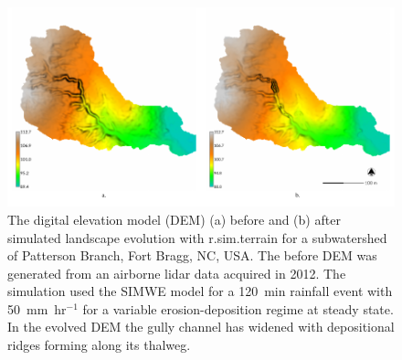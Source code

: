\documentclass[gmd, manuscript]{copernicus}
\begin{document}


\begin{figure}%
\center
\includegraphics[width=\textwidth,height=0.925\textheight,keepaspectratio]{figures/evolution.pdf}
\caption{
The digital elevation model (DEM) 
(a) before and (b) after
simulated landscape evolution with r.sim.terrain 
for a subwatershed of Patterson Branch, Fort Bragg, NC, USA. 
The before DEM was generated from an airborne lidar data acquired in 2012. 
The simulation used the SIMWE model
for a 120~\unit{min} rainfall event with 50~\unit{mm~hr}$^{-1}$
for a variable erosion-deposition regime at steady state.
In the evolved DEM 
the gully channel has widened 
with depositional ridges forming along its thalweg.}
\label{fig:evolution}
\end{figure}

\end{document}
